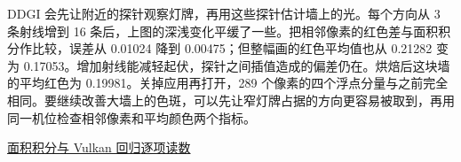 DDGI 会先让附近的探针观察灯牌，再用这些探针估计墙上的光。每个方向从 3 条射线增到 16 条后，上图的深浅变化平缓了一些。把相邻像素的红色差与面积积分作比较，误差从 0.01024 降到 0.00475；但整幅画的红色平均值也从 0.21282 变为 0.17053。增加射线能减轻起伏，探针之间插值造成的偏差仍在。烘焙后这块墙的平均红色为 0.19981。关掉应用再打开，289 个像素的四个浮点分量与之前完全相同。要继续改善大墙上的色斑，可以先让窄灯牌占据的方向更容易被取到，再用同一机位检查相邻像素和平均颜色两个指标。

\href{run:../../tests/EmissiveGICheck.h}{面积积分与 Vulkan 回归}\quad\href{run:../profiling/emissive-gi/measurements.csv}{逐项读数}
